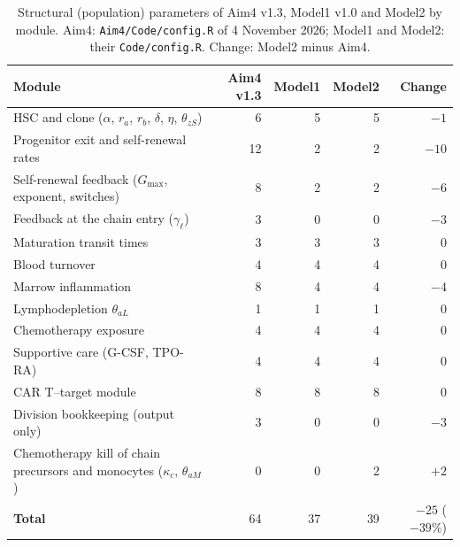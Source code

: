 \begin{table}[!htbp]
\centering
\small
\setlength{\tabcolsep}{3.5pt}
\caption{Structural (population) parameters of Aim4 v1.3, Model1 v1.0 and Model2 by module. Aim4: \texttt{Aim4/Code/config.R} of 4 November 2026; Model1 and Model2: their \texttt{Code/config.R}. Change: Model2 minus Aim4.}
\label{tab:reduction}
\begin{tabular}{>{\raggedright\arraybackslash}p{7.2cm}rrrr}
\toprule
Module & Aim4 v1.3 & Model1 & Model2 & Change \\
\midrule
HSC and clone ($\alpha$, $r_a$, $r_b$, $\delta$, $\eta$, $\theta_{zS}$) & 6 & 5 & 5 & $-1$ \\
Progenitor exit and self-renewal rates & 12 & 2 & 2 & $-10$ \\
Self-renewal feedback ($G_{\max}$, exponent, switches) & 8 & 2 & 2 & $-6$ \\
Feedback at the chain entry ($\gamma_\ell$) & 3 & 0 & 0 & $-3$ \\
Maturation transit times & 3 & 3 & 3 & 0 \\
Blood turnover & 4 & 4 & 4 & 0 \\
Marrow inflammation & 8 & 4 & 4 & $-4$ \\
Lymphodepletion $\theta_{aL}$ & 1 & 1 & 1 & 0 \\
Chemotherapy exposure & 4 & 4 & 4 & 0 \\
Supportive care (G-CSF, TPO-RA) & 4 & 4 & 4 & 0 \\
CAR T--target module & 8 & 8 & 8 & 0 \\
Division bookkeeping (output only) & 3 & 0 & 0 & $-3$ \\
Chemotherapy kill of chain precursors and monocytes ($\kappa_c$, $\theta_{aM}$) & 0 & 0 & 2 & $+2$ \\
\midrule
\textbf{Total} & 64 & 37 & 39 & $-25$ ($-39\%$) \\
\bottomrule
\end{tabular}
\end{table}
